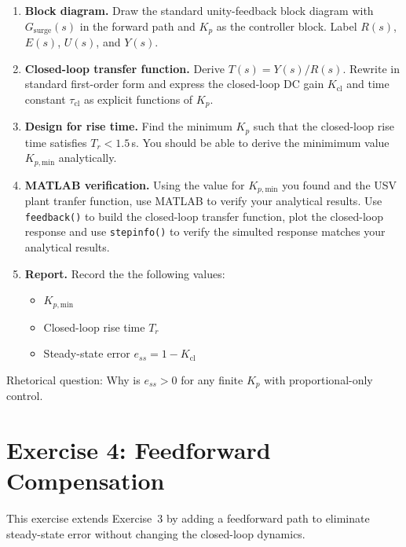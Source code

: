 \documentclass[11pt]{article}
\begin{document}
\begin{enumerate}

\item \textbf{Block diagram.}
  Draw the standard unity-feedback block diagram with $G_{\mathrm{surge}}(s)$
  in the forward path and $K_p$ as the controller block.
  Label $R(s)$, $E(s)$, $U(s)$, and $Y(s)$.

\item \textbf{Closed-loop transfer function.}
  Derive $T(s) = Y(s)/R(s)$.  Rewrite in standard first-order form and express
  the closed-loop DC gain $K_{\mathrm{cl}}$ and time constant $\tau_{\mathrm{cl}}$
  as explicit functions of $K_p$.

\item \textbf{Design for rise time.}
  Find the minimum $K_p$ such that the closed-loop rise time satisfies
  $T_r < 1.5$\,s.  You should be able to derive the minimimum value $K_{p,\mathrm{min}}$ analytically.

\item \textbf{MATLAB verification.}
  Using the value for $K_{p,\mathrm{min}}$ you found and the USV plant tranfer function, use MATLAB to verify your analytical results.  
  Use \texttt{feedback()} to build the closed-loop transfer function, plot the closed-loop response and use \texttt{stepinfo()} to verify the simulted response matches your analytical results.

\item \textbf{Report.}
  Record the the following values:
  \begin{itemize}
    \item $K_{p,\mathrm{min}}$
    \item Closed-loop rise time $T_r$
    \item Steady-state error $e_{ss} = 1 - K_{\mathrm{cl}}$
  \end{itemize}

\end{enumerate}

Rhetorical question: Why is $e_{ss} > 0$ for any finite $K_p$ with proportional-only control.


\section*{Exercise 4: Feedforward Compensation}

This exercise extends Exercise~3 by adding a feedforward path to eliminate
steady-state error without changing the closed-loop dynamics.
\end{document}
